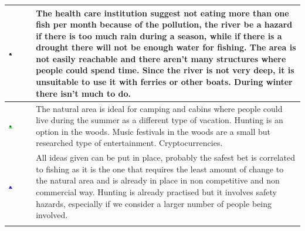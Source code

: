 \begin{center}
\begin{tabular}{ | m{} | m{}| }
\hline
\includegraphics[width=0.20\textwidth]{Img/Black.png} & The health care institution suggest not eating more than one fish per month because of the pollution, the river be a hazard if there is too much rain during a season, while if there is a drought there will not be enough water for fishing. \newline The area is not easily reachable and there aren't many structures where people could spend time. \newline Since the river is not very deep, it is unsuitable to use it with ferries or other boats. \newline During winter there isn't much to do. \\ 
\hline
\includegraphics[width=0.20\textwidth]{Img/Green.png} & The natural area is ideal for camping and cabins where people could live during the summer as a different type of vacation. \newline Hunting is an option in the woods. \newline Music festivals in the woods are a small but researched type of entertainment. Cryptocurrencies. \\  
\hline
\includegraphics[width=0.20\textwidth]{Img/Blue.png} & All ideas given can be put in place, probably the safest bet is correlated to fishing as it is the one that requires the least amount of change to the natural area and is already in place in non competitive and non commercial way. \newline Hunting is already practised but it involves safety hazards, especially if we consider a larger number of people being involved. \\  \\ 
\hline
\end{tabular}
\end{center}